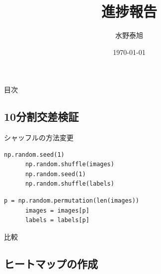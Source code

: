 \documentclass[leno,xcolor=dvipsnames]{beamer}
\title{進捗報告}
\date{\today}
\author{水野泰旭}
\institute{弘前大学理工学部電子情報工学科４年}
\begin{document}
  \maketitle

  \begin{frame}{目次}
    \tableofcontents
  \end{frame}

  \begin{frame}
    \section{10分割交差検証}
  \end{frame}

  \begin{frame}[fragile]{シャッフルの方法変更}
    \begin{lstlisting}[caption=シードを用いたシャッフル]
      np.random.seed(1)
      np.random.shuffle(images)
      np.random.seed(1)
      np.random.shuffle(labels)
    \end{lstlisting}

    \begin{lstlisting}[caption=numpy.random.permutationを用いたシャッフル]
      p = np.random.permutation(len(images))
      images = images[p]
      labels = labels[p]
    \end{lstlisting}
  \end{frame}

  \begin{frame}{比較}
  \end{frame}

  \begin{frame}
    \section{ヒートマップの作成}
  \end{frame}
\end{document}
